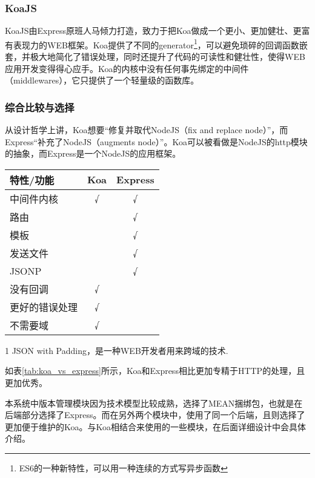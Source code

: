 \subsubsection{KoaJS}
KoaJS由Express原班人马倾力打造，致力于把Koa做成一个更小、更加健壮、更富有表现力的WEB框架。Koa提供了不同的generator\footnote{ES6的一种新特性，可以用一种连续的方式写异步函数}，可以避免琐碎的回调函数嵌套，并极大地简化了错误处理，同时还提升了代码的可读性和健壮性，使得WEB应用开发变得得心应手。Koa的内核中没有任何事先绑定的中间件（middlewares），它只提供了一个轻量级的函数库。

\subsubsection{综合比较与选择}
从设计哲学上讲，Koa想要“修复并取代NodeJS（fix and replace node）”，而Express“补充了NodeJS（augments node）”。Koa可以被看做是NodeJS的http模块的抽象，而Express是一个NodeJS的应用框架。

\begin{table}[!htpb]
  \centering
  \begin{threeparttable}[b]
    \begin{tabular}{lcc}
      \toprule
      特性/功能 & Koa & Express \\
      \midrule
      中间件内核 & √ & √ \\
      路由 & & √ \\
      模板 & & √ \\
      发送文件 &   & √ \\
      JSONP\tnote{1} &   & √ \\
      没有回调 & √ &  \\
      更好的错误处理 & √ &  \\
      不需要域 & √ &  \\
      \bottomrule
    \end{tabular}
    \begin{tablenotes}
    \item [1] JSON with Padding，是一种WEB开发者用来跨域的技术.
    \end{tablenotes}
  \end{threeparttable}
\end{table}

如表\ref{tab:koa_vs_express}所示，Koa和Express相比更加专精于HTTP的处理，且更加优秀。

本系统中版本管理模块因为技术模型比较成熟，选择了MEAN捆绑包，也就是在后端部分选择了Express。而在另外两个模块中，使用了同一个后端，且则选择了更加便于维护的Koa。与Koa相结合来使用的一些模块，在后面详细设计中会具体介绍。

